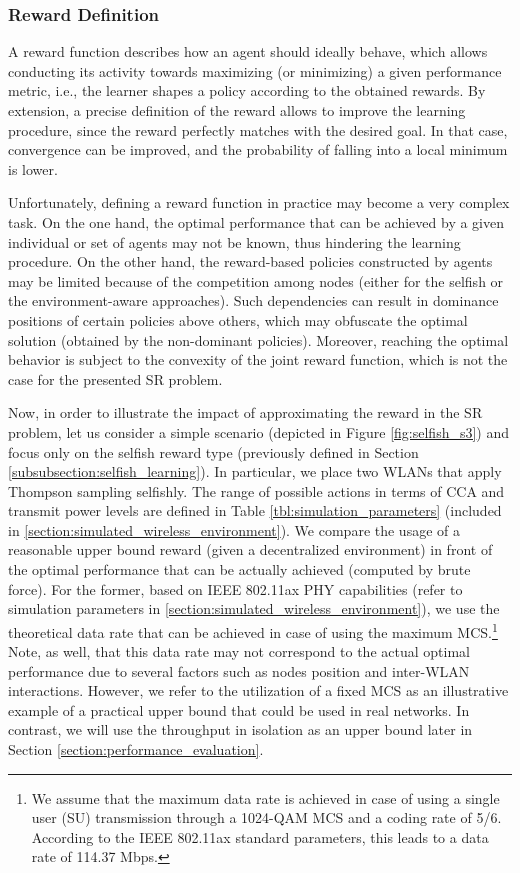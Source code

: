 \documentclass[preprint,12pt]{elsarticle}
\begin{document}
\subsubsection{Reward Definition}
\label{subsubsection:reward}
A reward function describes how an agent should ideally behave, which allows conducting its activity towards maximizing (or minimizing) a given performance metric, i.e., the learner shapes a policy according to the obtained rewards. By extension, a precise definition of the reward allows to improve the learning procedure, since the reward perfectly matches with the desired goal. In that case, convergence can be improved, and the probability of falling into a local minimum is lower. 

Unfortunately, defining a reward function in practice may become a very complex task. On the one hand, the optimal performance that can be achieved by a given individual or set of agents may not be known, thus hindering the learning procedure. On the other hand, the reward-based policies constructed by agents may be limited because of the competition among nodes (either for the selfish or the environment-aware approaches). Such dependencies can result in dominance positions of certain policies above others, which may obfuscate the optimal solution (obtained by the non-dominant policies). Moreover, reaching the optimal behavior is subject to the convexity of the joint reward function, which is not the case for the presented SR problem.

Now, in order to illustrate the impact of approximating the reward in the SR problem, let us consider a simple scenario (depicted in Figure \ref{fig:selfish_s3}) and focus only on the selfish reward type (previously defined in Section \ref{subsubsection:selfish_learning}). In particular, we place two WLANs that apply Thompson sampling selfishly. The range of possible actions in terms of CCA and transmit power levels are defined in Table \ref{tbl:simulation_parameters} (included in \ref{section:simulated_wireless_environment}). We compare the usage of a reasonable upper bound reward (given a decentralized environment) in front of the optimal performance that can be actually achieved (computed by brute force). For the former, based on IEEE 802.11ax PHY capabilities (refer to simulation parameters in \ref{section:simulated_wireless_environment}), we use the theoretical data rate that can be achieved in case of using the maximum MCS.\footnote{We assume that the maximum data rate is achieved in case of using a single user (SU) transmission through a 1024-QAM MCS and a coding rate of 5/6. According to the IEEE 802.11ax standard parameters, this leads to a data rate of 114.37 Mbps.} Note, as well, that this data rate may not correspond to the actual optimal performance due to several factors such as nodes position and inter-WLAN interactions. However, we refer to the utilization of a fixed MCS as an illustrative example of a practical upper bound that could be used in real networks. In contrast, we will use the throughput in isolation as an upper bound later in Section \ref{section:performance_evaluation}.
\end{document}
